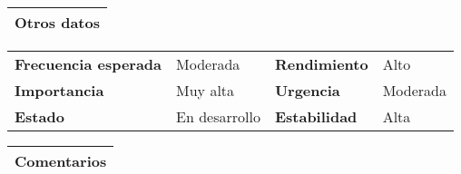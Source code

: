 \documentclass[11pt,a4paper]{article}
\begin{document}
\begin{table}[H]
	\begin{tabularx}{\textwidth}{X}
		\textbf{Otros datos}\\ \hline
	\end{tabularx}
	\begin{tabularx}{\textwidth}{lXlX}
		\textbf{Frecuencia esperada} & Moderada & \textbf{Rendimiento} & Alto\\
		\textbf{Importancia} & Muy alta & \textbf{Urgencia} & Moderada \\
		\textbf{Estado} & En desarrollo & \textbf{Estabilidad} & Alta\\
	\end{tabularx}
	
	\begin{tabularx}{\textwidth}{X}
		\textbf{Comentarios}\\ \hline
	\end{tabularx}
\end{table}

\end{document}

